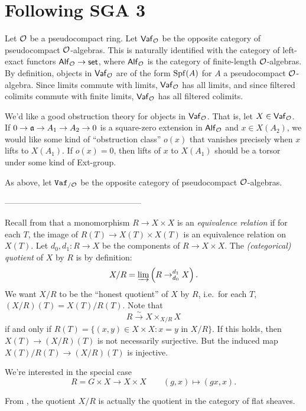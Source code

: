 \documentclass[phd,cornellheadings,draft]{cornell}
\begin{document}
\section{Following SGA 3}

Let $\mathcal{O}$ be a pseudocompact ring. Let $\mathsf{Vaf}_{\mathcal{O}}$ be the opposite 
category of pseudocompact $\mathcal{O}$-algebras. This is naturally identified with the 
category of left-exact functors $\mathsf{Alf}_{\mathcal{O}}\to \mathsf{set}$, where 
$\mathsf{Alf}_{\mathcal{O}}$ is the category of finite-length $\mathcal{O}$-algebras. By 
definition, objects in $\mathsf{Vaf}_{\mathcal{O}}$ are of the form 
$\operatorname{Spf}(A)$ for $A$ a pseudocompact $\mathcal{O}$-algebra. Since limits 
commute with limits, $\mathsf{Vaf}_{\mathcal{O}}$ has all limits, and since 
filtered colimits commute with finite limits, $\mathsf{Vaf}_{\mathcal{O}}$ has all 
filtered colimits. 

We'd like a good obstruction theory for objects in $\mathsf{Vaf}_{\mathcal{O}}$. That 
is, let $X\in \mathsf{Vaf}_{\mathcal{O}}$. If $0 \to \mathfrak{a}\to A_1\to A_2\to 0$ is a 
square-zero extension in $\mathsf{Alf}_{\mathcal{O}}$ and $x\in X(A_2)$, we would like 
some kind of ``obstruction class'' $o(x)$ that vanishes precisely when 
$x$ lifts to $X(A_1)$. If $o(x)=0$, then lifts of $x$ to $X(A_1)$ should 
be a torsor under some kind of Ext-group. 

As above, let $\mathtt{Vaf}_{/\mathcal{O}}$ be the opposite category of pseudocompact 
$\mathcal{O}$-algebras. 

--------------------------------------------------

Recall from \cite[V.2.b]{sga3-i} that a monomorphism $R\to X\times X$ is an 
\emph{equivalence relation} if for each $T$, the image of 
$R(T)\to X(T)\times X(T)$ is an equivalence relation on $X(T)$. Let 
$d_0,d_1\colon R\to X$ be the components of $R\to X\times X$. The 
\emph{(categorical) quotient} of $X$ by $R$ is by definition:
\[
  X/R = \varinjlim\left(R\to_{d_0}^{d_1} X\right) .
\]
We want $X/R$ to be the ``honest quotient'' of $X$ by $R$, i.e.~for each $T$, 
$(X/R)(T) = X(T)/R(T)$. Note that 
\[
  R\xrightarrow\sim X\times_{X/R} X
\]
if and only if $R(T)=\{(x,y)\in X\times X\colon x=y\text{ in }X/R\}$. If this 
holds, then $X(T)\to (X/R)(T)$ is not necessarily surjective. But the induced 
map $X(T)/R(T)\to (X/R)(T)$ is injective. 

We're interested in the special case 
\[
  R = G\times X\to X\times X\qquad (g,x)\mapsto (g x,x) .
\]

From \cite[VII\textsubscript{B}.1.5]{sga3-i}, the quotient $X/R$ is actually 
the quotient in the category of flat sheaves. 
\end{document}
